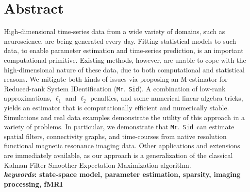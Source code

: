\documentclass[fleqn,12pt]{article}
\newcommand{\mrsid}{{\sc \texttt{Mr}.~\texttt{Sid}}}
\begin{document}
\section*{Abstract}
High-dimensional time-series data from a wide variety of domains, such as neuroscience, are being generated every day. Fitting statistical models to such data, to enable parameter estimation and time-series prediction, is an important computational primitive.
Existing methods, however, are unable to cope with the high-dimensional nature of these data, due to both computational and statistical reasons.  We mitigate both kinds of issues via proposing an M-estimator for Reduced-rank System IDentification (\mrsid). A combination of low-rank approximations, $\ell_1$ and $\ell_2$ penalties, and some numerical linear algebra tricks, yields an estimator that is computationally efficient and numerically stable.  Simulations and real data examples demonstrate the utility of this approach in a variety of problems.  In particular, we demonstrate that \mrsid~can estimate spatial filters, connectivity graphs, and time-courses from native resolution functional magnetic resonance imaging data.  Other applications and extensions are immediately available, as our approach is a generalization of the classical Kalman Filter-Smoother Expectation-Maximization algorithm.
\\
\textbf{\emph{keywords}: state-space model, parameter estimation, sparsity, imaging processing, fMRI}
\end{document}
